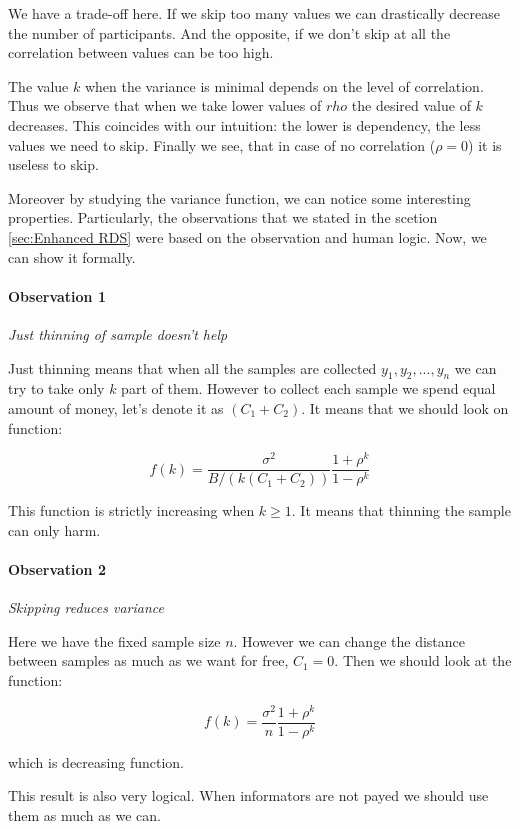 \documentclass[12pt]{report}
\newcommand\myworries[1]{\textcolor{red}{#1}}
\renewcommand\myworries[1]{}
\begin{document}
We have a trade-off here. If we skip too many values we can drastically decrease the number of participants. And the opposite, if we don't skip at all the correlation between values can be too high. 

The value $k$ when the variance is minimal depends on the level of correlation. Thus we observe that when we take lower values of $rho$ the desired value of $k$ decreases. This coincides with our intuition: the lower is dependency, the less values we need to skip. Finally we see, that in case of no correlation ($\rho = 0$) it is useless to skip.
 
Moreover by studying the variance function, we can notice some interesting properties. Particularly, the observations that we stated in the scetion \ref{sec:Enhanced RDS} were based on the observation and human logic. Now, we can show it formally.

\paragraph{Observation 1} \textit{Just thinning of sample doesn't help}

Just thinning means that when all the samples are collected $y_1, y_2, ...,y_n$ we can try to take only $k$ part of them. However to collect each sample we spend equal amount of money, let's denote it as $(C_1+C_2)$. It means that we should look on function:

$$ f(k) = \frac{\sigma^2}{B/(k(C_1 + C_2))} \frac{1+\rho^{k}}{1-\rho^{k}}$$

This function is strictly increasing when $k \geq 1$. It means that thinning the sample can only harm. 

\myworries{put the proof in the appendix}

\paragraph{Observation 2} \textit{Skipping reduces variance}

Here we have the fixed sample size $n$. However we can change the distance between samples as much as we want for free, $C_1 = 0$. Then we should look at the function:

$$ f(k) = \frac{\sigma^2}{n} \frac{1+\rho^{k}}{1-\rho^{k}}$$

which is decreasing function.

This result is also very logical. When informators are not payed we should use them as much as we can.
\end{document}

